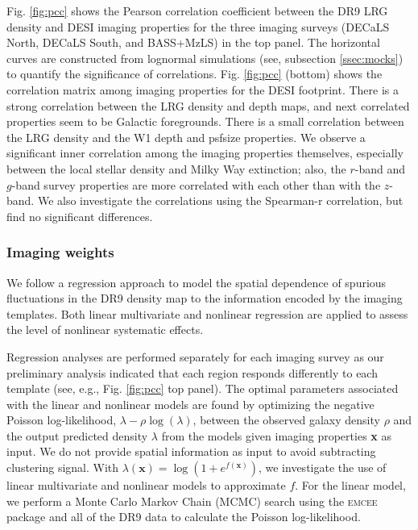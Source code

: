 Fig. \ref{fig:pcc} shows the Pearson correlation coefficient between the DR9 LRG density and DESI imaging properties for the three imaging surveys (DECaLS North, DECaLS South, and BASS+MzLS) in the top panel. The horizontal curves are constructed from lognormal simulations (see, subsection \ref{ssec:mocks}) to quantify the significance of correlations. Fig. \ref{fig:pcc} (bottom) shows the correlation matrix among imaging properties for the DESI footprint. There is a strong correlation between the LRG density and depth maps, and next correlated properties seem to be Galactic foregrounds. There is a small correlation between the LRG density and the W1 depth and psfsize properties. We observe a significant inner correlation among the imaging properties themselves, especially between the local stellar density and Milky Way extinction; also, the $r$-band and $g$-band survey properties are more correlated with each other than with the $z$-band. We also investigate the correlations using the Spearman-r correlation, but find no significant differences.

\subsubsection{Imaging weights}
We follow a regression approach to model the spatial dependence of spurious fluctuations in the DR9 density map to the information encoded by the imaging templates. Both linear multivariate and nonlinear regression are applied to assess the level of nonlinear systematic effects. 

Regression analyses are performed separately for each imaging survey as our preliminary analysis indicated that each region responds differently to each template (see, e.g., Fig. \ref{fig:pcc} top panel). The optimal parameters associated with the linear and nonlinear models are found by optimizing the negative Poisson log-likelihood, $\lambda - \rho \log(\lambda)$, between the observed galaxy density $\rho$ and the output predicted density $\lambda$ from the models given imaging properties \textbf{x} as input. We do not provide spatial information as input to avoid subtracting clustering signal. With $\lambda(\textbf{x}) = \log (1+e^{f(\textbf{x})})$, we investigate the use of linear multivariate and nonlinear models to approximate $f$. For the linear model, we perform a Monte Carlo Markov Chain (MCMC) search using the \textsc{emcee} package \citep{2013PASP..125..306F} and all of the DR9 data to calculate the Poisson log-likelihood. 


